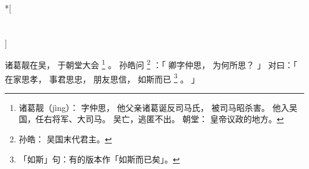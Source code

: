 
\switchcolumn[0]*[\section{}]

诸葛靓在吴，
于朝堂大会%
\footnote{%
    诸葛靓（jìng）：
        字仲思，
        他父亲诸葛诞反司马氏，
        被司马昭杀害。
        他入吴国，任右将军、大司马。
        吴亡，逃匿不出。
    朝堂：
        皇帝议政的地方。
}%
。
孙皓问%
\footnote{%
    孙皓：
        吴国末代君主。
}%
：「
    卿字仲思，
    为何所思？
」
对曰：「
    在家思孝，
    事君思忠，
    朋友思信，
    如斯而已%
    \footnote{%
        「如斯」句：有的版本作「如斯而已矣」。
    }%
    。
」

\switchcolumn


